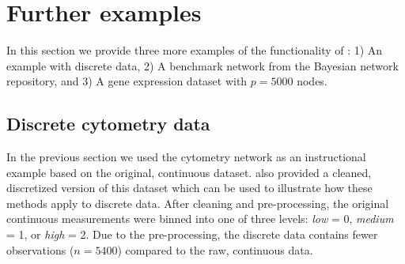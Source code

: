 \documentclass[article]{jss}
\renewcommand{\|}{\,|\,}
\begin{document}
\section{Further examples}
\label{sec:ex}

In this section we provide three more examples of the functionality of : 1) An example with discrete data, 2) A benchmark network from the Bayesian network repository, and 3) A gene expression dataset with $p=5000$ nodes.

\subsection{Discrete cytometry data}
\label{subsec:discrete}

In the previous section we used the cytometry network as an instructional example based on the original, continuous dataset. \cite{sachs2005} also provided a cleaned, discretized version of this dataset which can be used to illustrate how these methods apply to discrete data. After cleaning and pre-processing, the original continuous measurements were binned into one of three levels: \emph{low} = 0, \emph{medium} = 1, or \emph{high} = 2. Due to the pre-processing, the discrete data contains fewer observations ($n=5400$) compared to the raw, continuous data.
\end{document}

